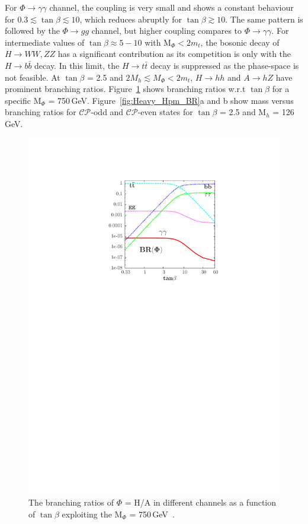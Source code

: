 For $\Phi\rightarrow \gamma\gamma$ channel, the coupling is very small and shows a constant behaviour for $0.3\lesssim \tan\beta \lesssim 10$, which reduces abruptly for $\tan\beta \gtrsim 10$. The same pattern is followed by the $\Phi \rightarrow gg$ channel, but higher coupling compares to $\Phi\rightarrow \gamma\gamma$. For intermediate values of $\tan\beta \approx 5-10$ with M$_{\Phi} < 2m_{t}$, the bosonic decay of $H\rightarrow WW, ZZ$ has a significant contribution as its competition is only with the $H\rightarrow b\bar{b}$ decay. In this limit, the $H\rightarrow t\bar{t}$ decay is suppressed as the phase-space is not feasible. At $\tan\beta$ = 2.5 and $2M_{h} \lesssim M_{\Phi}< 2m_{t}$, $H\rightarrow hh$ and $A\rightarrow hZ$ have prominent branching ratios. Figure~\ref{fig:Heavy_H750_BR} shows branching ratios w.r.t $\tan\beta$ for a specific M$_{\Phi}$ = 750\,GeV. Figure~\ref{fig:Heavy_Hpm_BR}a and b show mass versus branching ratios for $\mathcal{CP}$-odd and $\mathcal{CP}$-even states for $\tan\beta$ = 2.5 and M$_{h}$ = 126\,GeV. 
\begin{figure}[htp]
\centering
\includegraphics[trim={6.5cm 17.5cm 5.0cm 3.50cm},clip, scale=0.8]{fig/sm_beyond/BR-Atb.pdf}
\caption{The branching ratios of $\Phi$ = H/A in different channels as a function of $\tan\beta$ exploiting the M$_{\Phi}$ = 750\,GeV~\cite{Djouadi:2016eyy}. }\label{fig:Heavy_H750_BR}
\end{figure}

